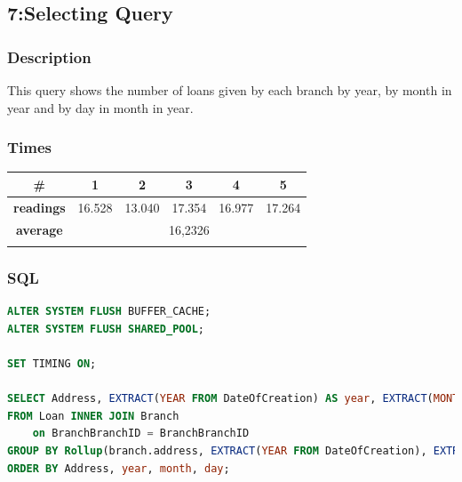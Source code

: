 \documentclass[a4paper, 10pt]{article}
\begin{document}
\subsection{7:Selecting Query}
\subsubsection{Description}
This query shows the number of loans given by each branch by year, by month in year and by day in month in year.
\subsubsection{Times}
\begin{table}[H]
\centering
\begin{tabular}{cccccc}
\hline
\multicolumn{1}{|c|}{\textbf{\#}}       & \multicolumn{1}{c|}{\textbf{1}} & \multicolumn{1}{c|}{\textbf{2}} & \multicolumn{1}{c|}{\textbf{3}} & \multicolumn{1}{c|}{\textbf{4}} & \multicolumn{1}{c|}{\textbf{5}} \\ \hline
\multicolumn{1}{|c|}{\textbf{readings}} & \multicolumn{1}{c|}{16.528}           & \multicolumn{1}{c|}{13.040}           & \multicolumn{1}{c|}{17.354}           & \multicolumn{1}{c|}{16.977}           & \multicolumn{1}{c|}{17.264}           \\ \hline
\multicolumn{1}{|c|}{\textbf{average}}      & \multicolumn{5}{c|}{16,2326}                                                                                                                                                   \\ \hline
\textbf{}                               & \textbf{}                       & \textbf{}                       & \textbf{}                       & \textbf{}                       & \textbf{}                      
\end{tabular}
\end{table}
\subsubsection{SQL}
\begin{lstlisting}[language=SQL]
ALTER SYSTEM FLUSH BUFFER_CACHE;
ALTER SYSTEM FLUSH SHARED_POOL;

SET TIMING ON;

SELECT Address, EXTRACT(YEAR FROM DateOfCreation) AS year, EXTRACT(MONTH FROM DateOfCreation) AS month, EXTRACT(DAY FROM DateOfCreation) AS day, Count(*) AS total
FROM Loan INNER JOIN Branch 
    on BranchBranchID = BranchBranchID
GROUP BY Rollup(branch.address, EXTRACT(YEAR FROM DateOfCreation), EXTRACT(MONTH FROM DateOfCreation), Extract(DAY FROM DateOfCreation))
ORDER BY Address, year, month, day;
\end{lstlisting}
\end{document}
